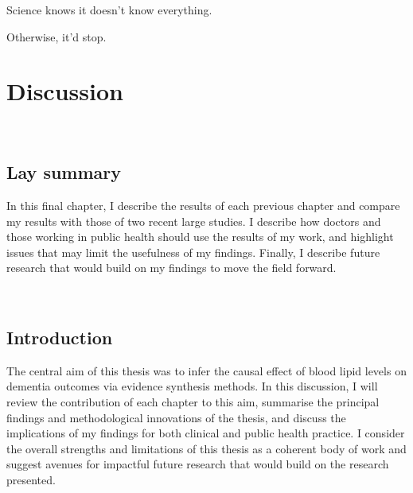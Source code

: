 \documentclass[a4paper, twoside]{templates/ociamthesis}
\begin{document}
\begin{savequote}
Science knows it doesn't know everything.

Otherwise, it'd stop.
\end{savequote}



\hypertarget{discussion-heading}{%
\chapter{Discussion}\label{discussion-heading}}

~

\minitoc 

\newpage

\begin{laybox}

\hypertarget{lay-summary-7}{%
\section{Lay summary}\label{lay-summary-7}}

In this final chapter, I describe the results of each previous chapter and compare my results with those of two recent large studies. I describe how doctors and those working in public health should use the results of my work, and highlight issues that may limit the usefulness of my findings. Finally, I describe future research that would build on my findings to move the field forward.

\end{laybox}

~

\hypertarget{introduction-4}{%
\section{Introduction}\label{introduction-4}}

The central aim of this thesis was to infer the causal effect of blood lipid levels on dementia outcomes via evidence synthesis methods. In this discussion, I will review the contribution of each chapter to this aim, summarise the principal findings and methodological innovations of the thesis, and discuss the implications of my findings for both clinical and public health practice. I consider the overall strengths and limitations of this thesis as a coherent body of work and suggest avenues for impactful future research that would build on the research presented.
\end{document}
